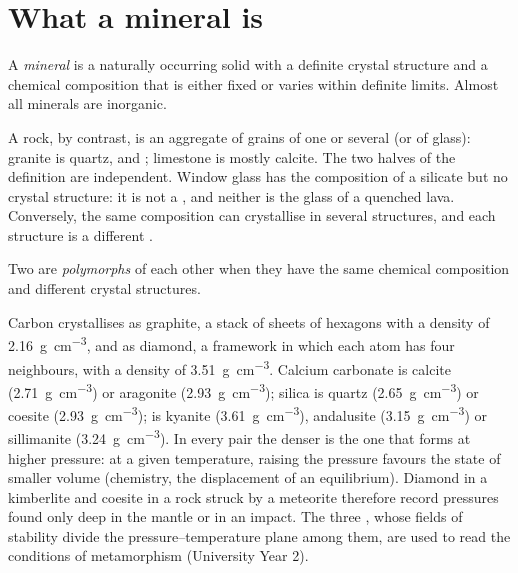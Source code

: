 \section{What a mineral is}

\begin{definition}[Mineral]\label{def:b1:rock-forming-minerals:mineral}
A \emph{mineral} is a naturally occurring solid with a
definite crystal structure and a chemical composition that is either fixed or
varies within definite limits. Almost all minerals are inorganic.
\end{definition}

A rock, by contrast, is an aggregate of grains of one or several  (or
of glass): granite is quartz,  and ; limestone is mostly calcite.
The two halves of the definition are independent. Window glass has the
composition of a silicate but no crystal structure: it is not a , and
neither is the glass of a quenched lava. Conversely, the same composition can
crystallise in several structures, and each structure is a different
.

\begin{definition}[Polymorph]\label{def:b1:rock-forming-minerals:polymorph}
Two  are \emph{polymorphs} of each other when they
have the same chemical composition and different crystal structures.
\end{definition}

Carbon crystallises as graphite, a stack of sheets of hexagons with a
density of \qty{2.16}{g.cm^{-3}}, and as diamond, a framework in which each
atom has four neighbours, with a density of \qty{3.51}{g.cm^{-3}}. Calcium
carbonate is calcite (\qty{2.71}{g.cm^{-3}}) or aragonite
(\qty{2.93}{g.cm^{-3}}); silica is quartz (\qty{2.65}{g.cm^{-3}}) or coesite
(\qty{2.93}{g.cm^{-3}});  is kyanite (\qty{3.61}{g.cm^{-3}}),
andalusite (\qty{3.15}{g.cm^{-3}}) or sillimanite (\qty{3.24}{g.cm^{-3}}).
In every pair the denser  is the one that forms at higher pressure:
at a given temperature, raising the pressure favours the state of smaller
volume (chemistry, the displacement of an equilibrium). Diamond in a
kimberlite and coesite in a rock struck by a meteorite therefore record
pressures found only deep in the mantle or in an impact. The three
 , whose fields of stability divide the
pressure--temperature plane among them, are used to read the conditions of
metamorphism (University Year 2).

